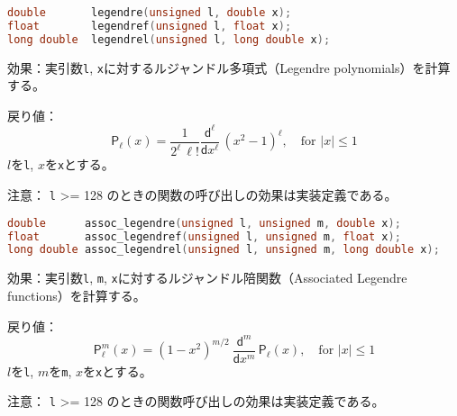 \bgroup
\begin{lstlisting}[language=C++, aboveskip=0.0zw]
double       legendre(unsigned l, double x);
float        legendref(unsigned l, float x);
long double  legendrel(unsigned l, long double x);
\end{lstlisting}
\egroup

\noindent
\textsf{効果}：実引数\lstinline!l!,
\lstinline!x!に対するルジャンドル多項式（Legendre
polynomials）を計算する。

\noindent
\textsf{戻り値}：
\[
  \mathsf{P}_\ell(x) =
  \frac{1}
       {2^\ell \, \ell!}
  \frac{ \mathsf{d} ^ \ell}
       { \mathsf{d}x ^ \ell} \, (x^2 - 1) ^ \ell,
       \quad \mbox{for $|x| \le 1$}
\]
\hspace*{3em}\(l\)を\lstinline!l!, \(x\)を\lstinline!x!とする。

\noindent
\textsf{注意}： \lstinline!l! \textgreater{}= 128
のときの関数の呼び出しの効果は実装定義である。

%

\bgroup
\begin{lstlisting}[language=C++, aboveskip=0.0zw]
double      assoc_legendre(unsigned l, unsigned m, double x);
float       assoc_legendref(unsigned l, unsigned m, float x);
long double assoc_legendrel(unsigned l, unsigned m, long double x);
\end{lstlisting}
\egroup

\noindent
\textsf{効果}：実引数\lstinline!l!, \lstinline!m!,
\lstinline!x!に対するルジャンドル陪関数（Associated Legendre
functions）を計算する。

\noindent
\textsf{戻り値}：
\[
  \mathsf{P}_\ell^m(x) =
  (1 - x^2) ^ {m/2}
  \:
  \frac{ \mathsf{d} ^ m}
       { \mathsf{d}x ^ m} \, \mathsf{P}_\ell(x),
       \quad \mbox{for $|x| \le 1$}
\]
\hspace*{3em}\(l\)を\lstinline!l!, \(m\)を\lstinline!m!, \(x\)を\lstinline!x!とする。

\noindent
\textsf{注意}： \lstinline!l! \textgreater{}= 128
のときの関数呼び出しの効果は実装定義である。

%

